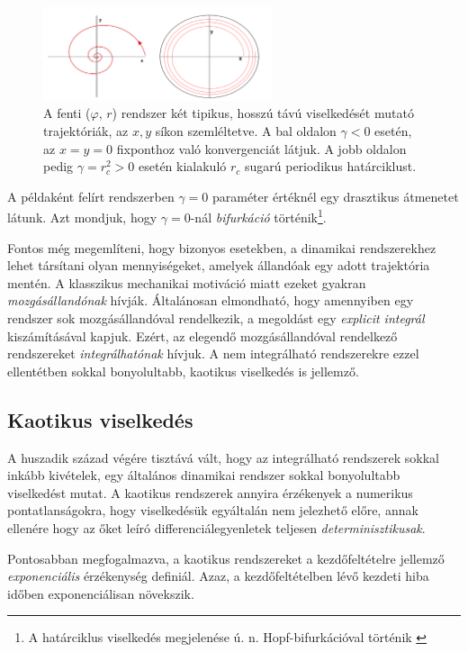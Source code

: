\documentclass[12pt]{article}
\theoremstyle{plain}
\begin{document}
\begin{figure}[h!]
    \centering
    \includegraphics[width = 0.6\textwidth]{media/rotation.png}
    \caption{A fenti ($\varphi$, $r$) rendszer két tipikus, hosszú távú viselkedését mutató trajektóriák, az $x, y$ síkon szemléltetve. A bal oldalon $\gamma<0$ esetén, az $x=y=0$ fixponthoz való konvergenciát látjuk. A jobb oldalon pedig $\gamma=r_c^2>0$ esetén kialakuló $r_c$ sugarú periodikus határciklust. }
    \label{fig:rot}
\end{figure}
A példaként felírt rendszerben $\gamma=0$ paraméter értéknél egy drasztikus átmenetet látunk. Azt mondjuk, hogy $\gamma = 0$-nál {\em bifurkáció} történik\footnote{A határciklus viselkedés megjelenése ú. n. Hopf-bifurkációval történik \cite{compl}}.

Fontos még megemlíteni, hogy bizonyos esetekben, a dinamikai rendszerekhez lehet társítani olyan mennyiségeket, amelyek állandóak egy adott trajektória mentén. A klasszikus mechanikai motiváció miatt ezeket gyakran {\em mozgásállandónak} hívják. Általánosan elmondható, hogy amennyiben egy rendszer sok mozgásállandóval rendelkezik, a megoldást egy {\em explicit integrál} kiszámításával kapjuk. Ezért, az elegendő mozgásállandóval rendelkező rendszereket {\em integrálhatónak} hívjuk. A nem integrálható rendszerekre ezzel ellentétben sokkal bonyolultabb, kaotikus viselkedés is jellemző. 
\subsection{Kaotikus viselkedés}
A huszadik század végére tisztává vált, hogy az integrálható rendszerek sokkal inkább kivételek, egy általános dinamikai rendszer sokkal bonyolultabb viselkedést mutat. A kaotikus rendszerek annyira érzékenyek a numerikus pontatlanságokra, hogy viselkedésük egyáltalán nem jelezhető előre, annak ellenére hogy az őket leíró differenciálegyenletek teljesen {\em determinisztikusak}.

Pontosabban megfogalmazva, a kaotikus rendszereket a kezdőfeltételre jellemző {\em exponenciális} érzékenység definiál. Azaz, a kezdőfeltételben lévő kezdeti hiba időben exponenciálisan növekszik. 
\end{document}
